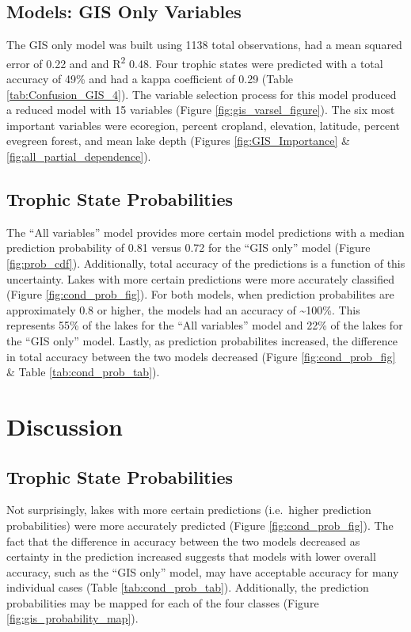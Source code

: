 \documentclass[11pt,]{article}
\begin{document}
\subsection{Models: GIS Only Variables}\label{models-gis-only-variables}

The GIS only model was built using 1138 total observations, had a mean
squared error of 0.22 and and R\textsuperscript{2} 0.48. Four trophic
states were predicted with a total accuracy of 49\% and had a kappa
coefficient of 0.29 (Table \ref{tab:Confusion_GIS_4}). The variable
selection process for this model produced a reduced model with 15
variables (Figure \ref{fig:gis_varsel_figure}). The six most important
variables were ecoregion, percent cropland, elevation, latitude, percent
evegreen forest, and mean lake depth (Figures \ref{fig:GIS_Importance}
\& \ref{fig:all_partial_dependence}).

\subsection{Trophic State
Probabilities}\label{trophic-state-probabilities-1}

The ``All variables'' model provides more certain model predictions with
a median prediction probability of 0.81 versus 0.72 for the ``GIS only''
model (Figure \ref{fig:prob_cdf}). Additionally, total accuracy of the
predictions is a function of this uncertainty. Lakes with more certain
predictions were more accurately classified (Figure
\ref{fig:cond_prob_fig}). For both models, when prediction probabilites
are approximately 0.8 or higher, the models had an accuracy of
\textasciitilde{}100\%. This represents 55\% of the lakes for the ``All
variables'' model and 22\% of the lakes for the ``GIS only'' model.
Lastly, as prediction probabilites increased, the difference in total
accuracy between the two models decreased (Figure
\ref{fig:cond_prob_fig} \& Table \ref{tab:cond_prob_tab}).

\section{Discussion}\label{discussion}

\subsection{Trophic State
Probabilities}\label{trophic-state-probabilities-2}

Not surprisingly, lakes with more certain predictions (i.e.~higher
prediction probabilities) were more accurately predicted (Figure
\ref{fig:cond_prob_fig}). The fact that the difference in accuracy
between the two models decreased as certainty in the prediction
increased suggests that models with lower overall accuracy, such as the
``GIS only'' model, may have acceptable accuracy for many individual
cases (Table \ref{tab:cond_prob_tab}). Additionally, the prediction
probabilities may be mapped for each of the four classes (Figure
\ref{fig:gis_probability_map}).
\end{document}
